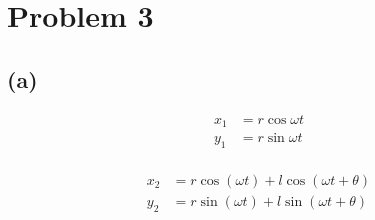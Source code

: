 \documentclass[letter, 10pts]{article}
\begin{document}

\section*{Problem 3}
\subsection*{(a)}
\begin{minipage}{0.5\textwidth}
\begin{align*}
	x_1 &= r \cos \omega t \\
	y_1 &= r \sin \omega t\\
\end{align*}
\end{minipage}
\hfill
\begin{minipage}{0.5\textwidth}
\begin{align*}
	x_2 &= r \cos (\omega t) + l \cos ( \omega t + \theta) \\
	y_2 &= r \sin(\omega t) + l \sin (\omega t + \theta) 
\end{align*}
\end{minipage} 
\end{document}
